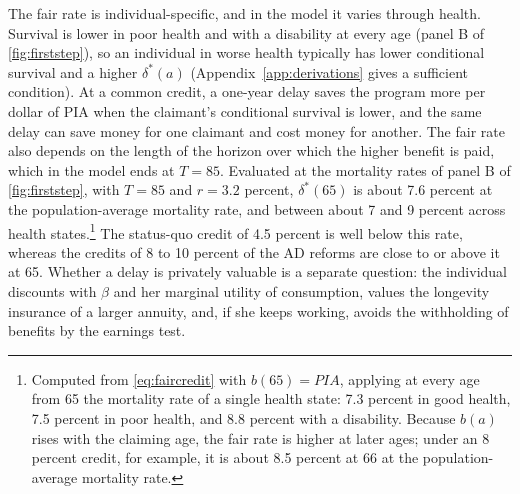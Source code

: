 The fair rate is individual-specific, and in the model it varies through health. Survival is lower in poor health and with a disability at every age (panel B of \autoref{fig:firststep}), so an individual in worse health typically has lower conditional survival and a higher $\delta^{*}(a)$ (Appendix~\ref{app:derivations} gives a sufficient condition). At a common credit, a one-year delay saves the program more per dollar of PIA when the claimant's conditional survival is lower, and the same delay can save money for one claimant and cost money for another. The fair rate also depends on the length of the horizon over which the higher benefit is paid, which in the model ends at $T=85$. Evaluated at the mortality rates of panel B of \autoref{fig:firststep}, with $T=85$ and $r=3.2$ percent, $\delta^{*}(65)$ is about 7.6 percent at the population-average mortality rate, and between about 7 and 9 percent across health states.\footnote{Computed from \eqref{eq:faircredit} with $b(65)=\mathit{PIA}$, applying at every age from 65 the mortality rate of a single health state: 7.3 percent in good health, 7.5 percent in poor health, and 8.8 percent with a disability. Because $b(a)$ rises with the claiming age, the fair rate is higher at later ages; under an 8 percent credit, for example, it is about 8.5 percent at 66 at the population-average mortality rate.} %
The status-quo credit of 4.5 percent is well below this rate, whereas the credits of 8 to 10 percent of the AD reforms are close to or above it at 65. Whether a delay is privately valuable is a separate question: the individual discounts with $\beta$ and her marginal utility of consumption, values the longevity insurance of a larger annuity, and, if she keeps working, avoids the withholding of benefits by the earnings test.

